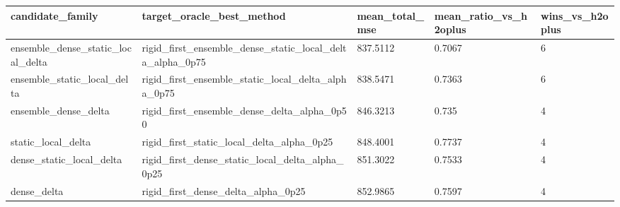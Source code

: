 \begin{tabular}{lllll}
\toprule
candidate\_family & target\_oracle\_best\_method & mean\_total\_mse & mean\_ratio\_vs\_h2oplus & wins\_vs\_h2oplus \\
\midrule
ensemble\_dense\_static\_local\_delta & rigid\_first\_ensemble\_dense\_static\_local\_delta\_alpha\_0p75 & 837.5112 & 0.7067 & 6 \\
ensemble\_static\_local\_delta & rigid\_first\_ensemble\_static\_local\_delta\_alpha\_0p75 & 838.5471 & 0.7363 & 6 \\
ensemble\_dense\_delta & rigid\_first\_ensemble\_dense\_delta\_alpha\_0p50 & 846.3213 & 0.735 & 4 \\
static\_local\_delta & rigid\_first\_static\_local\_delta\_alpha\_0p25 & 848.4001 & 0.7737 & 4 \\
dense\_static\_local\_delta & rigid\_first\_dense\_static\_local\_delta\_alpha\_0p25 & 851.3022 & 0.7533 & 4 \\
dense\_delta & rigid\_first\_dense\_delta\_alpha\_0p25 & 852.9865 & 0.7597 & 4 \\
\bottomrule
\end{tabular}
